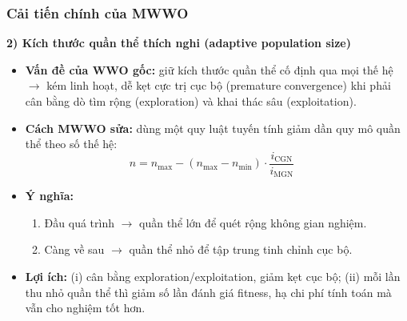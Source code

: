 \begin{frame}
    \frametitle{Cải tiến chính của MWWO}

    \textbf{2) Kích thước quần thể thích nghi (adaptive population size)}
    \begin{itemize}
        \item \textbf{Vấn đề của WWO gốc:} giữ kích thước quần thể cố định qua mọi thế hệ $\rightarrow$ kém linh hoạt, dễ kẹt cực trị cục bộ (premature convergence) khi phải cân bằng dò tìm rộng (exploration) và khai thác sâu (exploitation).
        \item \textbf{Cách MWWO sửa:} dùng một quy luật tuyến tính giảm dần quy mô quần thể theo số thế hệ:
        \begin{equation}
        n = n_{\max} - (n_{\max} - n_{\min}) \cdot \frac{i_{\text{CGN}}}{i_{\text{MGN}}} \quad
        \end{equation}
        \item \textbf{Ý nghĩa:} 
        \begin{enumerate}
            \item Đầu quá trình $\rightarrow$ quần thể lớn để quét rộng không gian nghiệm.
            \item Càng về sau $\rightarrow$ quần thể nhỏ để tập trung tinh chỉnh cục bộ.
        \end{enumerate}
        \item \textbf{Lợi ích:} (i) cân bằng exploration/exploitation, giảm kẹt cục bộ; (ii) mỗi lần thu nhỏ quần thể thì giảm số lần đánh giá fitness, hạ chi phí tính toán mà vẫn cho nghiệm tốt hơn.
    \end{itemize}

    \vspace{0.5em}
    
\end{frame}

